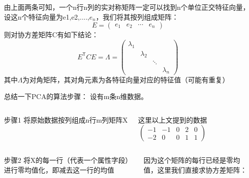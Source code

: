   \begin{frame}
  由上面两条可知，一个n行n列的实对称矩阵一定可以找到n个单位正交特征向量，设这n个特征向量为e1,e2,....,$e_n$，我们将其按列组成矩阵：
  \[E=\begin{pmatrix}
  e_1 &  e_2 & \cdots &  e_n
\end{pmatrix}\]
则对协方差矩阵C有如下结论：
\[E^\mathsf{T}CE=\Lambda=\begin{pmatrix}
  \lambda_1 &           &     &\\
              &  \lambda_2 &      & \\
              &            & \ddots &\\
              &           &      &\lambda_n
\end{pmatrix}\]
其中\(\Lambda\)为对角矩阵，其对角元素为各特征向量对应的特征值（可能有重复）
  \end{frame}
  
 
  
  \begin{frame}
  总结一下PCA的算法步骤：
  设有m条n维数据。
  \begin{columns}
  \column{4cm}
  \begin{block}{步骤1}
将原始数据按列组成n行m列矩阵X
\end{block}
\column{4cm}
\begin{example}
这里以上文提到的数据
\[\begin{pmatrix}
  -1 & -1 & 0 & 2 & 0 \\
  -2 & 0  & 0 & 1 & 1
\end{pmatrix}\]
\end{example}
\end{columns}
  \end{frame}
  
  
  \begin{frame}
  \begin{columns}
  \column{4cm}
  \begin{block}{步骤2}
  将X的每一行（代表一个属性字段）进行零均值化，即减去这一行的均值
  \end{block}
  \column{4cm}
  \begin{example}
   因为这个矩阵的每行已经是零均值，这里我们直接求协方差矩阵：
   \end{example}
  \end{columns}
  \end{frame}
  
